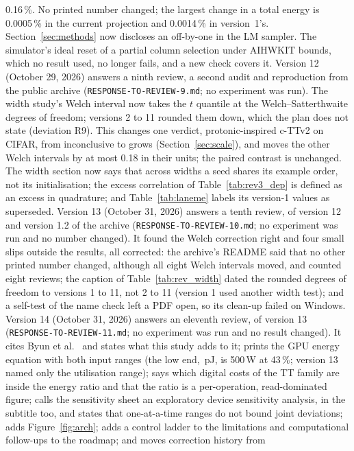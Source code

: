 0.16\,\%. No printed number changed; the largest change in a total energy is 0.0005\,\% in the current projection
and 0.0014\,\% in version~1's. Section~\ref{sec:methods} now discloses an off-by-one in the LM sampler. The
simulator's ideal reset of a partial column selection under AIHWKIT bounds, which no result used, no longer fails, and
a new check covers it.
Version 12 (October 29, 2026) answers a ninth review, a second audit and reproduction from the public archive
(\texttt{RESPONSE-TO-REVIEW-9.md}; no experiment was run). The width study's Welch interval now takes the $t$ quantile at
the Welch--Satterthwaite degrees of freedom; versions 2 to 11 rounded them down, which the plan does not state (deviation
R9). This changes one verdict, protonic-inspired c-TTv2 on CIFAR, from inconclusive to grows (Section~\ref{sec:scale}),
and moves the other Welch intervals by at most 0.18 in their units; the paired contrast is unchanged. The width section now
says that across widths a seed shares its example order, not its initialisation; the excess correlation of
Table~\ref{tab:rev3_dep} is defined as an excess in quadrature; and Table~\ref{tab:laneme} labels its version-1 values as
superseded.
Version 13 (October 31, 2026) answers a tenth review, of version 12 and version 1.2 of the archive
(\texttt{RESPONSE-TO-REVIEW-10.md}; no experiment was run and no number changed). It found the Welch correction right
and four small slips outside the results, all corrected: the archive's README said that no other printed number changed,
although all eight Welch intervals moved, and counted eight reviews; the caption of Table~\ref{tab:rev_width} dated the
rounded degrees of freedom to versions 1 to 11, not 2 to 11 (version 1 used another width test); and a self-test of the
name check left a PDF open, so its clean-up failed on Windows.
Version 14 (October 31, 2026) answers an eleventh review, of version 13 (\texttt{RESPONSE-TO-REVIEW-11.md}; no
experiment was run and no result changed). It cites Byun et al.~\cite{byun2024} and states what this study adds to it;
prints the GPU energy equation with both input ranges (the low end, \RVenGpuMeasLo\,pJ, is 500\,W at 43\,\%; version 13
named only the utilisation range); says which digital costs of the TT family are inside the energy ratio and that the ratio
is a per-operation, read-dominated figure; calls the sensitivity sheet an exploratory device sensitivity analysis, in the
subtitle too, and states that one-at-a-time ranges do not bound joint deviations; adds Figure~\ref{fig:arch}; adds a
control ladder to the limitations and computational follow-ups to the roadmap; and moves correction history from
